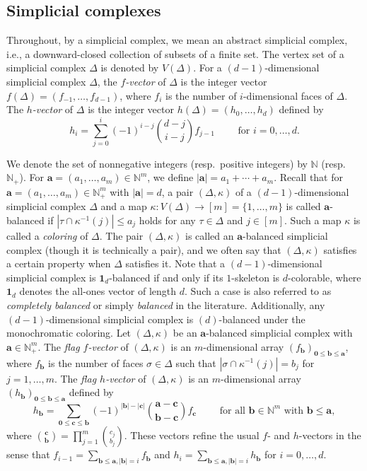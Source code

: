 \subsection{Simplicial complexes}
Throughout, by a simplicial complex, we mean an abstract simplicial complex, i.e., a downward-closed collection of subsets of a finite set.
The vertex set of a simplicial complex $\Delta$ is denoted by $V(\Delta)$.
For a $(d-1)$-dimensional simplicial complex $\Delta$, the \emph{$f$-vector} of $\Delta$ is the integer vector $f(\Delta)=(f_{-1},\ldots,f_{d-1})$, where $f_i$ is the number of $i$-dimensional faces of $\Delta$. The \emph{$h$-vector} of $\Delta$ is the integer vector $h(\Delta)=(h_0,\ldots,h_d)$ defined by 
\[
h_i = \sum_{j=0}^i (-1)^{i-j} \binom{d-j}{i-j} f_{j-1} \qquad \text{ for $i=0,\ldots,d$}.
\]

We denote the set of nonnegative integers (resp.~positive integers) by $\mathbb{N}$ (resp.~$\mathbb{N}_+$).
For $\bm{a}=(a_1,\ldots,a_m) \in \mathbb{N}^m$, we define $|\bm{a}|=a_1+\cdots+a_m$.
Recall that for $\bm{a}=(a_1,\ldots,a_m) \in \mathbb{N}^m_+$ with $|\bm{a}|=d$, a pair $(\Delta,\kappa)$ of a $(d-1)$-dimensional simplicial complex $\Delta$ and a map $\kappa:V(\Delta)\rightarrow [m]=\{1,\ldots,m\}$ is called $\bm{a}$-balanced if $|\tau \cap \kappa^{-1}(j)| \leq a_j$ holds for any $\tau \in \Delta$ and $j \in [m]$. Such a map $\kappa$ is called a \emph{coloring} of $\Delta$.
The pair $(\Delta,\kappa)$ is called an $\bm{a}$-balanced simplicial complex (though it is technically a pair), and we often say that $(\Delta,\kappa)$ satisfies a certain property when $\Delta$ satisfies it.
Note that a $(d-1)$-dimensional simplicial complex is $\bm{1}_d$-balanced if and only if its $1$-skeleton is $d$-colorable, where $\bm{1}_d$ denotes the all-ones vector of length $d$. Such a case is also referred to as \emph{completely balanced} or simply \emph{balanced} in the literature. Additionally, any $(d-1)$-dimensional simplicial complex is $(d)$-balanced under the monochromatic coloring.
Let $(\Delta,\kappa)$ be an $\bm{a}$-balanced simplicial complex with $\bm{a} \in \mathbb{N}_+^m$.
The \emph{flag $f$-vector} of $(\Delta,\kappa)$ is an $m$-dimensional array $(f_{\bm{b}})_{\bm{0}\leq\bm{b}\leq\bm{a}}$, where $f_{\bm{b}}$ is the number of faces $\sigma \in \Delta$ such that $|\sigma \cap \kappa^{-1}(j)|=b_j$ for $j=1,\ldots,m$. 
The \emph{flag $h$-vector} of $(\Delta,\kappa)$ is an $m$-dimensional array $(h_{\bm{b}})_{\bm{0}\leq\bm{b}\leq\bm{a}}$ defined by
\[
h_{\bm{b}}=\sum_{\bm{0} \leq \bm{c}\leq\bm{b}}(-1)^{|\bm{b}|-|\bm{c}|}\binom{\bm{a}-\bm{c}}{\bm{b}-\bm{c}}f_{\bm{c}} \qquad \text{ for all $\bm{b} \in \mathbb{N}^m$ with $\bm{b} \leq \bm{a}$},
\]
where $\binom{\bm{c}}{\bm{b}}=\prod_{j=1}^m \binom{c_j}{b_j}$.
These vectors refine the usual $f$- and $h$-vectors in the sense that $f_{i-1}=\sum_{\bm{b} \leq \bm{a}, |\bm{b}|=i} f_{\bm{b}}$ and $h_{i}=\sum_{\bm{b} \leq \bm{a}, |\bm{b}|=i} h_{\bm{b}}$ for $i=0,\ldots,d$.


